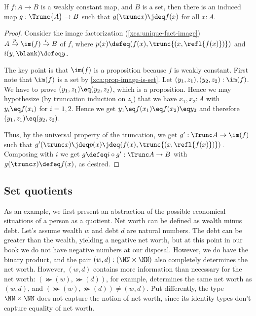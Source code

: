 \begin{theorem}\label{thm:wconstant-elim}
  If $f : A \to B$ is a weakly constant map, and $B$ is a set, then
  there is an induced map $g : \Trunc{A} \to B$ such that
  $g(\trunc x)\jdeq f(x)$ for all $x:A$.
\end{theorem}
\begin{proof}
  Consider the image factorization (\cref{xca:unique-fact-image})
  $A \xrightarrow{p}{} \im(f) \xrightarrow{i}{} B$ of $f$,
  where $p(x) \defeq (f(x),\trunc{(x,\refl{f(x)})})$
  and $i(y,\blank) \defeq y$.

  The key point is that $\im(f)$ is a proposition because
  $f$ is weakly constant. First note that $\im(f)$ is a set
  by \cref{xca:prop-image-is-set}.
  Let $(y_1,z_1),(y_2,z_2):\im(f)$. We have to prove
  $(y_1,z_1) \eq (y_2,z_2)$, which is a proposition.
  Hence we may hypothesize (by truncation induction on $z_i$)
  that we have $x_1,x_2:A$ with $y_i \eq f(x_i)$ for $i=1,2$.
  Hence we get $y_1 \eq f(x_1) \eq f(x_2) \eq y_2$ and
  therefore $(y_1,z_1) \eq (y_2,z_2)$.

  Thus, by the universal property of the truncation,
  we get $g' : \Trunc A \to \im(f)$ such
  that $g'(\trunc x) \jdeq p(x) \jdeq (f(x),\trunc{(x,\refl{f(x)})})$.
  Composing with $i$ we get $g\defeq i\circ g' : \Trunc A \to B$
  with $g(\trunc x) \defeq f(x)$, as desired.
\end{proof}

\subsection{Set quotients}

As an example, we first present an abstraction of the possible
economical situations of a person as a quotient.
Net worth can be defined as wealth minus debt.
Let's assume wealth $w$ and debt $d$ are natural numbers.
The debt can be greater than the wealth, yielding a negative net worth,
but at this point in our book we do not have negative numbers at our disposal.
However, we do have the binary product, and the pair
$(w,d): (\NN\times\NN)$ also completely determines the net worth.
However, $(w,d)$ contains more information than necessary for the net worth:
$(\Succ(w),\Succ(d))$, for example, determines the same net worth
as $(w,d)$, and $(\Succ(w),\Succ(d))\ne(w,d)$. Put differently,
the type $\NN\times\NN$ does not capture the notion of net worth,
since its identity types don't capture equality of net worth.


